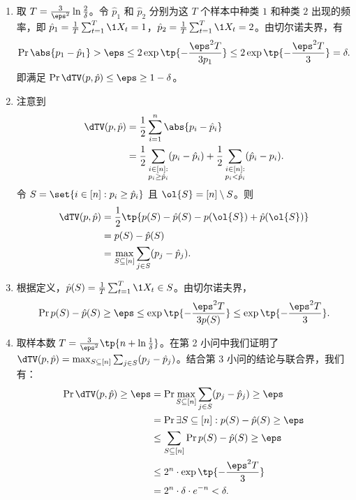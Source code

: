 \begin{solution}
    \begin{enumerate}
        \item 取 $T = \frac{3}{\eps^2} \ln \frac{2}{\delta}$。令 $\hat{p}_1$ 和 $\hat{p}_2$ 分别为这 $T$ 个样本中种类 $1$ 和种类 $2$ 出现的频率，即 $\hat{p}_1 = \frac{1}{T} \sum_{t=1}^T \1{X_t = 1}$，$\hat{p}_2 = \frac{1}{T} \sum_{t=1}^T \1{X_t = 2}$。由切尔诺夫界，有
        \[
            \Pr{\abs{p_1 - \hat{p}_1} > \eps} \le 2\exp\tp{-\frac{\eps^2 T}{3p_1}} \le 2\exp\tp{-\frac{\eps^2 T}{3}} = \delta.
        \]
        即满足 $\Pr{\dTV(p, \hat{p}) \le \eps} \ge 1 - \delta$。
        \item 注意到
        \begin{align*}
            \dTV(p, \hat{p}) &= \frac{1}{2} \sum_{i=1}^n \abs{p_i - \hat{p}_i} \\
            &= \frac{1}{2} \sum_{\substack{i \in [n]:\\ p_i \ge \hat{p}_i}} (p_i - \hat{p}_i) + \frac{1}{2} \sum_{\substack{i \in [n]:\\ p_i < \hat{p}_i}} (\hat{p}_i - p_i).
        \end{align*}
        令 $S = \set{i \in [n] : p_i \ge \hat{p}_i}$ 且 $\ol{S} = [n] \setminus S$。则
        \begin{align*}
            \dTV(p, \hat{p}) &= \frac{1}{2} \tp{p(S) - \hat{p}(S) - p(\ol{S}) + \hat{p}(\ol{S})} \\
            &= p(S) - \hat{p}(S) \\
            &= \max_{S \subseteq [n]} \sum_{j \in S} (p_j - \hat{p}_j).
        \end{align*}
        \item 根据定义，$\hat{p}(S) = \frac{1}{T} \sum_{t=1}^T \1{X_t \in S}$。由切尔诺夫界，
        \[
            \Pr{p(S) - \hat{p}(S) \ge \eps} \le \exp\tp{-\frac{\eps^2 T}{3p(S)}} \le \exp\tp{-\frac{\eps^2 T}{3}}.
        \]
        \item 取样本数 $T = \frac{3}{\eps^2}\tp{n + \ln \frac{1}{\delta}}$。在第 2 小问中我们证明了 $\dTV(p, \hat{p}) = \max_{S \subseteq [n]} \sum_{j \in S} (p_j - \hat{p}_j)$。结合第 3 小问的结论与联合界，我们有：
        \begin{align*}
            \Pr{\dTV(p, \hat{p}) \ge \eps} &= \Pr{\max_{S \subseteq [n]} \sum_{j \in S} (p_j - \hat{p}_j) \ge \eps} \\
            &= \Pr{\exists S \subseteq [n] : p(S) - \hat{p}(S) \ge \eps} \\
            &\le \sum_{S \subseteq [n]} \Pr{p(S) - \hat{p}(S) \ge \eps} \\
            &\le 2^n \cdot \exp\tp{-\frac{\eps^2 T}{3}} \\
            &= 2^n \cdot \delta \cdot e^{-n} < \delta.
        \end{align*}
    \end{enumerate}
\end{solution}

